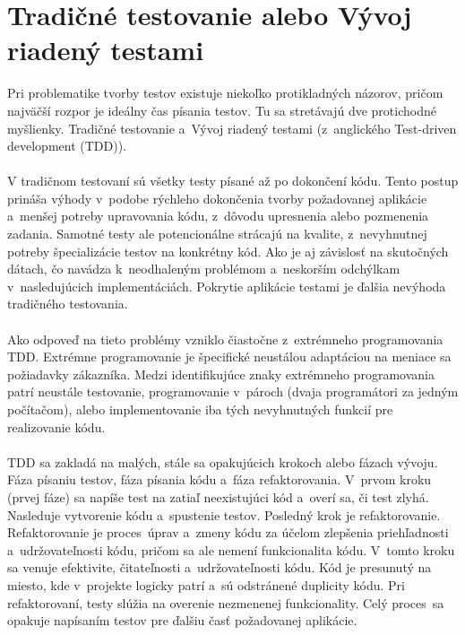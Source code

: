 \documentclass[
  digital, %
  table,   %
oneside,
  nolof,     %
  nolot,     %
]{fithesis3}
\begin{document}
\section{Tradičné testovanie alebo Vývoj riadený testami}

Pri problematike tvorby testov existuje niekoľko protikladných názorov, pričom najväčší rozpor je ideálny čas písania testov. Tu sa stretávajú dve protichodné myšlienky. Tradičné testovanie a~Vývoj riadený testami (z~anglického  Test-driven development (TDD))\cite{softwareTesting}. \paragraph{}
V tradičnom testovaní sú všetky testy písané až po dokončení kódu. Tento postup prináša výhody v~podobe rýchleho dokončenia tvorby požadovanej aplikácie a~menšej potreby upravovania kódu, z~dôvodu upresnenia alebo pozmenenia zadania.
Samotné testy ale potencionálne strácajú na kvalite, z~nevyhnutnej  potreby špecializácie testov na konkrétny kód. Ako je aj závislosť na skutočných dátach, čo navádza k~neodhaleným problémom a~neskorším odchýlkam v~nasledujúcich implementáciách. Pokrytie aplikácie testami je ďalšia nevýhoda tradičného testovania.  \paragraph{}
Ako odpoveď na tieto problémy vzniklo čiastočne z~extrémneho programovania TDD. Extrémne programovanie je špecifické neustálou adaptáciou na meniace sa  požiadavky zákazníka. Medzi identifikujúce znaky extrémneho programovania patrí neustále testovanie, programovanie v~pároch (dvaja programátori za jedným počítačom), alebo implementovanie  iba tých nevyhnutných funkcií pre realizovanie kódu. \paragraph{}
TDD sa zakladá na malých, stále sa opakujúcich krokoch alebo fázach vývoju. Fáza písaniu testov, fáza písania kódu a~fáza refaktorovania.
V~prvom kroku (prvej fáze) sa napíše test na zatiaľ neexistujúci kód a~overí sa, či test zlyhá. Nasleduje vytvorenie kódu a~spustenie testov. Posledný krok je refaktorovanie. Refaktorovanie je proces~úprav a~zmeny kódu za účelom zlepšenia priehľadnosti a~udržovateľnosti kódu, pričom sa ale nemení funkcionalita kódu. V~tomto kroku sa venuje efektivite, čitateľnosti a~udržovateľnosti kódu. Kód je presunutý na miesto, kde v~projekte logicky patrí a~sú odstránené duplicity kódu. Pri refaktorovaní, testy slúžia na overenie nezmenenej funkcionality. Celý proces~sa opakuje napísaním testov pre ďalšiu časť požadovanej aplikácie.
\end{document}
